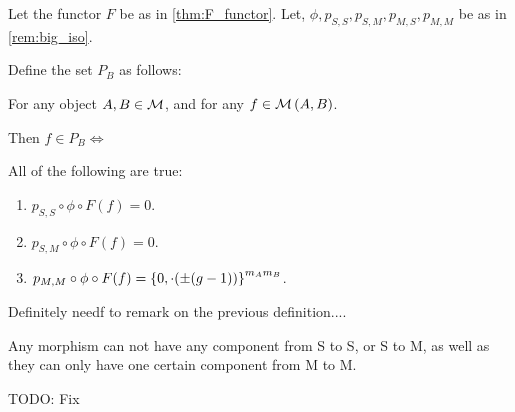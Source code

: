 \begin{definition} \label{def:unholy} %
    Let the functor \( F \) be as in \autoref{thm:F_functor}.  Let, \( \phi, p_{S, S}, p_{S, M}, p_{M, S}, p_{M, M} \) be as in \autoref{rem:big_iso}.

    Define the set \( P_B \) as follows:

    For any object \( A, B \in {\mathcal{M}} \), and for any \( f \in {\mathcal{M}}\left( A, B \right) \).

    Then \( f \in P_B \iff \)

    All of the following are true:
    \begin{enumerate}
        \item {
            \( p_{S, S} \circ \phi \circ F(f) = 0 \).
        }
        \item {
            \( p_{S, M} \circ \phi \circ F(f) = 0 \).
        }
        \item {
            \( p_{M, M} \circ \phi \circ F(f) = \left\{ 0, \cdot(\pm (g - 1)) \right\}^{m_A m_B} \).
        }
    \end{enumerate}
\end{definition}

\begin{remark}
    Definitely needf to remark on the previous definition.... 
    
    Any morphism can not have any component from S to S, or S to M, as well as they can only have one certain component from M to M.

    TODO: Fix
\end{remark}

